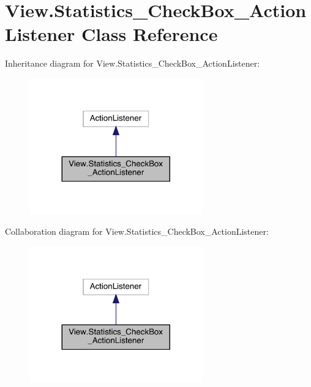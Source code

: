 \hypertarget{class_view_1_1_statistics___check_box___action_listener}{}\section{View.\+Statistics\+\_\+\+Check\+Box\+\_\+\+Action\+Listener Class Reference}
\label{class_view_1_1_statistics___check_box___action_listener}


Inheritance diagram for View.\+Statistics\+\_\+\+Check\+Box\+\_\+\+Action\+Listener\+:
\nopagebreak
\begin{figure}[H]
\begin{center}
\leavevmode
\includegraphics[width=212pt]{class_view_1_1_statistics___check_box___action_listener__inherit__graph}
\end{center}
\end{figure}


Collaboration diagram for View.\+Statistics\+\_\+\+Check\+Box\+\_\+\+Action\+Listener\+:
\nopagebreak
\begin{figure}[H]
\begin{center}
\leavevmode
\includegraphics[width=212pt]{class_view_1_1_statistics___check_box___action_listener__coll__graph}
\end{center}
\end{figure}
